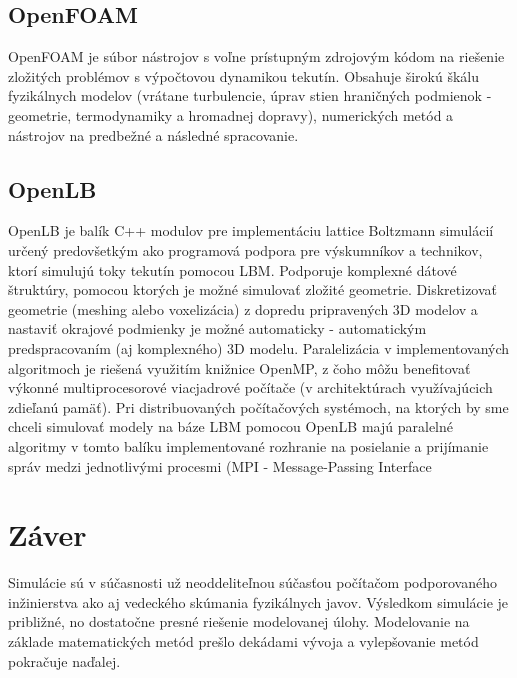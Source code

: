 \documentclass[]{tukediphc}
\begin{document}
\subsection{OpenFOAM}


OpenFOAM je súbor nástrojov s voľne prístupným zdrojovým kódom na riešenie zložitých problémov s výpočtovou dynamikou tekutín. Obsahuje širokú škálu fyzikálnych modelov (vrátane turbulencie, úprav stien hraničných podmienok - geometrie, termodynamiky a hromadnej dopravy), numerických metód a nástrojov na predbežné a následné spracovanie.

\subsection{OpenLB}

OpenLB je balík C++ modulov pre implementáciu lattice Boltzmann simulácií určený predovšetkým ako programová podpora pre výskumníkov a technikov, ktorí simulujú toky tekutín pomocou LBM. Podporuje komplexné dátové štruktúry, pomocou ktorých je možné simulovať zložité geometrie. Diskretizovať geometrie (meshing alebo voxelizácia) z dopredu pripravených 3D modelov a nastaviť okrajové podmienky je možné automaticky - automatickým predspracovaním (aj komplexného) 3D modelu. Paralelizácia v implementovaných algoritmoch je riešená využitím knižnice OpenMP, z čoho môžu benefitovať výkonné multiprocesorové viacjadrové počítače (v architektúrach využívajúcich zdieľanú pamäť). Pri distribuovaných počítačových systémoch, na ktorých by sme chceli simulovať modely na báze LBM pomocou OpenLB majú paralelné algoritmy v tomto balíku implementované rozhranie na posielanie a prijímanie správ medzi jednotlivými procesmi (MPI - Message-Passing Interface

\section{Záver}

Simulácie sú v súčasnosti už neoddeliteľnou súčasťou počítačom podporovaného inžinierstva ako aj vedeckého skúmania fyzikálnych javov. Výsledkom simulácie je približné, no dostatočne presné riešenie modelovanej úlohy. Modelovanie na základe matematických metód prešlo dekádami vývoja a vylepšovanie metód pokračuje naďalej.  

%

%
\end{document}

